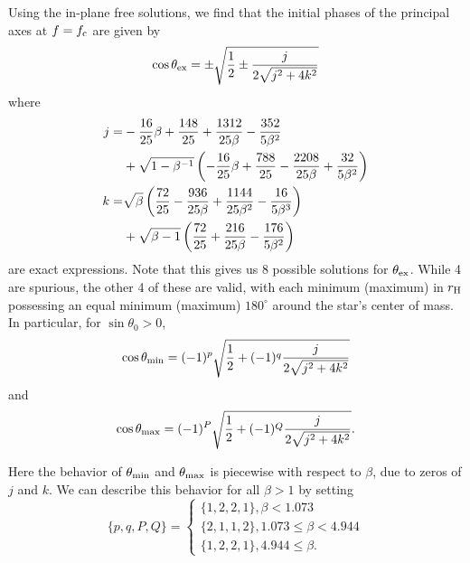 \documentclass[useAMS, twocolumn, usenatbib]{mn2e}
\begin{document}
Using the in-plane free solutions, we find that the initial phases of the principal axes at $f=f_{\rm c}$ are given by
\begin{equation}
\cos \theta_{\rm ex}= \pm \sqrt{\frac{1}{2} \pm \frac{j}{2\sqrt{j^2+4k^2}}}
\end{equation}
where 
\begin{align}\label{jks}
j=&-\frac{16}{25}\beta+\frac{148}{25}+\frac{1312}{25\beta}-\frac{352}{5\beta^2}\\
 &+\sqrt{1-\beta^{-1}}\left(-\frac{16}{25}\beta+\frac{788}{25}-\frac{2208}{25\beta}+\frac{32}{5\beta^2}\right)\notag \\ 
k=&\sqrt{\beta}\left( \frac{72}{25}-\frac{936}{25\beta}+\frac{1144}{25\beta^2}-\frac{16}{5\beta^3} \right)\notag\\
&+\sqrt{\beta -1} \left( \frac{72}{25}+\frac{216}{25\beta}-\frac{176}{5\beta^2} \right) \notag
\end{align}
are exact expressions.  Note that this gives us 8 possible solutions for $\theta_{\rm ex}$.  While 4 are spurious, the other 4 of these are valid, with each minimum (maximum) in $r_{\rm H}$ possessing an equal minimum (maximum) $180^{\circ}$ around the star's center of mass.  In particular, for $\sin \theta_0 >0$, 
\begin{equation}
\cos \theta_{\rm min}= (-1)^{p} \sqrt{\frac{1}{2} +(-1)^{q} \frac{j}{2\sqrt{j^2+4k^2}}}
\end{equation}
and
\begin{equation}
\cos \theta_{\rm max}= (-1)^{P} \sqrt{\frac{1}{2} +(-1)^{Q} \frac{j}{2\sqrt{j^2+4k^2}}}.
\end{equation}

Here the behavior of $\theta_{\rm min}$ and $\theta_{\rm max}$ is piecewise with respect to $\beta$, due to zeros of $j$ and $k$.  We can describe this behavior for all $\beta>1$ by setting
\begin{equation}
\{p, q, P, Q\}=
\begin{cases}
\{1, 2, 2, 1 \}, \beta<1.073 \\
\{2, 1, 1, 2 \}, 1.073\le \beta < 4.944 \\
\{1, 2, 2, 1 \}, 4.944 \le \beta .
\end{cases}
\end{equation}
\end{document}
